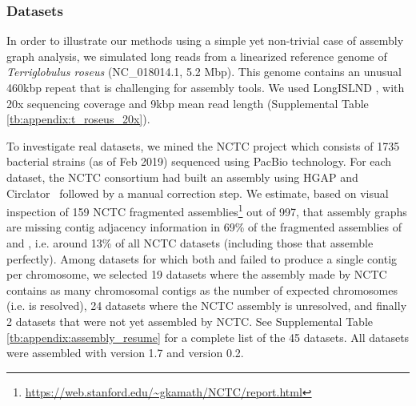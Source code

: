 \documentclass[./main.tex]{subfiles}
\newcommand{\modafterreview}[1]{#1}
\begin{document}
\subsubsection{Datasets}

In order to illustrate our methods using a simple yet non-trivial case of assembly graph analysis, we simulated long reads from a linearized reference genome of \textsl{Terriglobulus roseus} (NC\_018014.1, 5.2 Mbp). \modafterreview{This genome contains an unusual 460kbp repeat that is challenging for assembly tools.} We used LongISLND \citep{longislnd}, with 20x sequencing coverage and 9kbp mean read length %
(Supplemental Table \ref{tb:appendix:t_roseus_20x}). 

To investigate real datasets, we mined the NCTC project which consists of 1735 bacterial strains (as of Feb 2019) sequenced using PacBio technology. For each dataset, the NCTC consortium had built an assembly using HGAP and Circlator~\citep{circlator} followed by a manual correction step.
We estimate, based on visual inspection of 159 NCTC fragmented \hinge assemblies\footnote{\url{https://web.stanford.edu/~gkamath/NCTC/report.html}} out of 997, that assembly graphs are missing contig adjacency information in 69\% of the fragmented assemblies of \hinge and \miniasm, i.e. around 13\% of all NCTC datasets \modafterreview{(including those that assemble perfectly)}.
Among datasets for which both \canu and \hinge failed to produce a single contig per chromosome, %
we selected 19 datasets where the assembly made by NCTC contains as many chromosomal contigs as the number of expected chromosomes (i.e. is resolved), 24 datasets where the NCTC assembly is unresolved, and finally 2 datasets that were not yet assembled by NCTC.  See Supplemental Table \ref{tb:appendix:assembly_resume} for a complete list of the 45 datasets. 
All datasets were assembled with \canu version 1.7 and \miniasm version 0.2.

\end{document}
